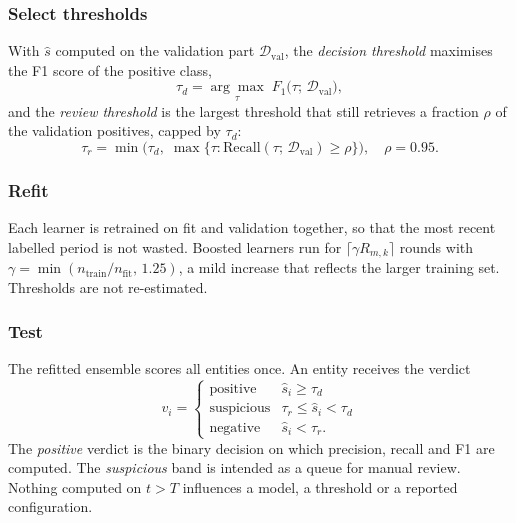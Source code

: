 \subsubsection{Select thresholds} With $\hat{s}$ computed on the validation part $\mathcal{D}_{\mathrm{val}}$, the \emph{decision threshold} maximises the F1 score of the positive class,
\begin{equation}\label{eq:taud}
\tau_d = \underset{\tau}{\arg\max}\; F_1\big(\tau ;\, \mathcal{D}_{\mathrm{val}}\big),
\end{equation}
and the \emph{review threshold} is the largest threshold that still retrieves a fraction $\rho$ of the validation positives, capped by $\tau_d$:
\begin{equation}\label{eq:taur}
\tau_r = \min\Big( \tau_d ,\; \max\{\tau : \mathrm{Recall}(\tau ;\, \mathcal{D}_{\mathrm{val}}) \ge \rho \} \Big), \quad \rho = 0.95 .
\end{equation}

\subsubsection{Refit} Each learner is retrained on fit and validation together, so that the most recent labelled period is not wasted. Boosted learners run for $\lceil \gamma R_{m,k} \rceil$ rounds with $\gamma = \min(n_{\mathrm{train}} / n_{\mathrm{fit}},\, 1.25)$, a mild increase that reflects the larger training set. Thresholds are not re-estimated.

\subsubsection{Test} The refitted ensemble scores all entities once. An entity receives the verdict
\begin{equation}\label{eq:verdict}
v_i = \begin{cases} \text{positive} & \hat{s}_i \ge \tau_d \\ \text{suspicious} & \tau_r \le \hat{s}_i < \tau_d \\ \text{negative} & \hat{s}_i < \tau_r . \end{cases}
\end{equation}
The \emph{positive} verdict is the binary decision on which precision, recall and F1 are computed. The \emph{suspicious} band is intended as a queue for manual review. Nothing computed on $t > T$ influences a model, a threshold or a reported configuration.

